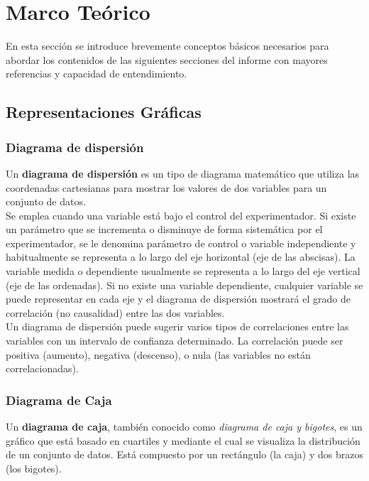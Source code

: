 \documentclass[osajnl,twocolumn,showpacs,superscriptaddress,10pt]{revtex4-1} %
\begin{document}
\section{Marco Teórico}

En esta sección se introduce brevemente conceptos básicos necesarios para abordar los contenidos de las siguientes secciones del informe con mayores referencias y capacidad de entendimiento. \\

\subsection{Representaciones Gráficas}

\subsubsection{Diagrama de dispersión}

Un \textbf{diagrama de dispersión} es un tipo de diagrama matemático que utiliza las coordenadas cartesianas para mostrar los valores de dos variables para un conjunto de datos. \\

Se emplea cuando una variable está bajo el control del experimentador. Si existe un parámetro que se incrementa o disminuye de forma sistemática por el experimentador, se le denomina parámetro de control o variable independiente y habitualmente se representa a lo largo del eje horizontal (eje de las abscisas). La variable medida o dependiente usualmente se representa a lo largo del eje vertical (eje de las ordenadas). Si no existe una variable dependiente, cualquier variable se puede representar en cada eje y el diagrama de dispersión mostrará el grado de correlación (no causalidad) entre las dos variables. \\

Un diagrama de dispersión puede sugerir varios tipos de correlaciones entre las variables con un intervalo de confianza determinado. La correlación puede ser positiva (aumento), negativa (descenso), o nula (las variables no están correlacionadas). 

\subsubsection{Diagrama de Caja}

Un \textbf{diagrama de caja}, también conocido como \textit{diagrama de caja y bigotes}, es un gráfico que está basado en cuartiles y mediante el cual se visualiza la distribución de un conjunto de datos. Está compuesto por un rectángulo (la caja) y dos brazos (los bigotes). \\
\end{document}
